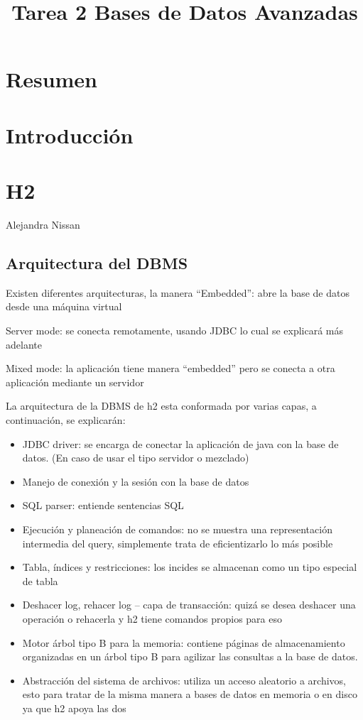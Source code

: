 \documentclass{acmart}
\title{Tarea 2 Bases de Datos Avanzadas}
\begin{document}
\maketitle

\tableofcontents

\section{Resumen}

\section{Introducción}

\section{H2}
Alejandra Nissan 

\subsection{Arquitectura del DBMS}
Existen diferentes arquitecturas, la manera “Embedded”: abre la base de datos desde una máquina virtual


Server mode: se conecta remotamente, usando JDBC lo cual se explicará más adelante
 

Mixed mode: la aplicación tiene manera “embedded” pero se conecta a otra aplicación mediante un servidor
  


La arquitectura de la DBMS de h2 esta conformada por varias capas, a continuación, se explicarán:
\begin{itemize}
\item JDBC driver: se encarga de conectar la aplicación de java con la base de datos. (En caso de usar el tipo servidor o mezclado)
\item Manejo de conexión y la sesión con la base de datos
\item SQL parser: entiende sentencias SQL
\item Ejecución y planeación de comandos: no se muestra una representación intermedia del query, simplemente trata de eficientizarlo lo más posible
\item Tabla, índices y restricciones: los incides se almacenan como un tipo especial de tabla
\item Deshacer log, rehacer log – capa de transacción: quizá se desea deshacer una operación o rehacerla y h2 tiene comandos propios para eso
\item Motor árbol tipo B para la memoria: contiene páginas de almacenamiento organizadas en un árbol tipo B para agilizar las consultas a la base de datos.
\item Abstracción del sistema de archivos: utiliza un acceso aleatorio a archivos, esto para tratar de la misma manera a bases de datos en memoria o en disco ya que h2 apoya las dos

\end{itemize}
\end{document}
